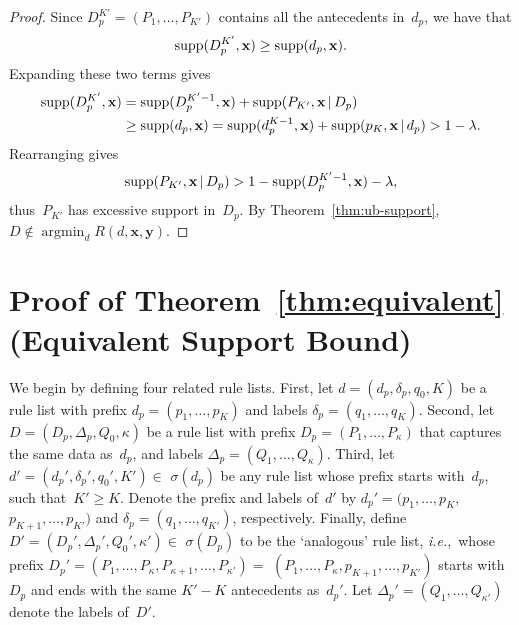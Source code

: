 \documentclass[twoside,11pt]{article}
\def\ie{{\it i.e.},~}
\newcommand{\x}{\mathbf{x}}
\newcommand{\y}{\mathbf{y}}
\def\RL{{d}}
\def\Prefix{d_p}
\def\Labels{\delta_p}
\def\Default{q_0}
\def\RLB{{D}}
\def\PrefixB{D_p}
\def\LabelsB{\Delta_p}
\def\DefaultB{Q_0}
\def\Obj{R}
\def\Reg{{\lambda}}
\def\Supp{\textnormal{supp}}
\def\StartsWith{\sigma}
\DeclareMathOperator*{\argmin}{argmin}
\newcommand{\given}{\,|\,}
\begin{document}
\begin{proof}
Since ${\PrefixB^{K'} = (P_1, \dots, P_{K'})}$
contains all the antecedents in~$\Prefix$, we have that
\begin{align*}
\Supp(\PrefixB^{K'}, \x) \ge \Supp(\Prefix, \x).
\end{align*}
Expanding these two terms gives
\begin{align*}
\Supp(\PrefixB^{K'}, \x)
&= \Supp(\PrefixB^{K'-1}, \x) + \Supp(P_{K'}, \x \given \PrefixB) \\
&\ge \Supp(\Prefix, \x)
= \Supp(\Prefix^{K-1}, \x) + \Supp(p_K, \x \given \Prefix)
> 1 - \Reg.
\end{align*}
Rearranging gives
\begin{align*}
\Supp(P_{K'}, \x \given \PrefixB)
> 1 - \Supp(\PrefixB^{K'-1}, \x) - \Reg,
\end{align*}
thus~$P_{K'}$ has excessive support in~$\PrefixB$.
%
By Theorem~\ref{thm:ub-support},
${\RLB \notin \argmin_{\RL} \Obj(\RL, \x, \y)}$.
\end{proof}

\section{Proof of Theorem~\ref{thm:equivalent} (Equivalent Support Bound)}
\label{appendix:equiv-supp}

We begin by defining four related rule lists.
%
First, let ${\RL = (\Prefix, \Labels, \Default, K)}$
be a rule list with prefix ${\Prefix = (p_1, \dots, p_K)}$
and labels ${\Labels = (q_1, \dots, q_K)}$.
%
Second, let ${\RLB = (\PrefixB, \LabelsB, \DefaultB, \kappa)}$
be a rule list with prefix ${\PrefixB = (P_1, \dots, P_\kappa)}$
that captures the same data as~$\Prefix$,
and labels ${\LabelsB = (Q_1, \dots, Q_\kappa)}$.
%
Third, let ${\RL' = (\Prefix', \Labels', \Default', K') \in}$
${\StartsWith(\Prefix)}$ be any rule list
whose prefix starts with~$\Prefix$, such that~${K' \ge K}$.
%
Denote the prefix and labels of~$\RL'$ by
${\Prefix' = (p_1, \dots, p_K,}$ ${p_{K+1}, \dots, p_{K'})}$
and ${\Labels = (q_1, \dots, q_{K'})}$, respectively.
%
Finally, define ${\RLB' = (\PrefixB', \LabelsB', \DefaultB', \kappa') \in}$
${\StartsWith(\PrefixB)}$ to be the `analogous' rule list, \ie whose prefix
${\PrefixB' = (P_1, \dots, P_\kappa, P_{\kappa+1}, \dots, P_{\kappa'}) =}$
${(P_1, \dots, P_\kappa, p_{K+1}, \dots, p_{K'})}$
starts with~$\PrefixB$ and ends with the same ${K'-K}$
antecedents as~$\Prefix'$.
%
Let ${\LabelsB' = (Q_1, \dots, Q_{\kappa'})}$
denote the labels of~$\RLB'$.
\end{document}
